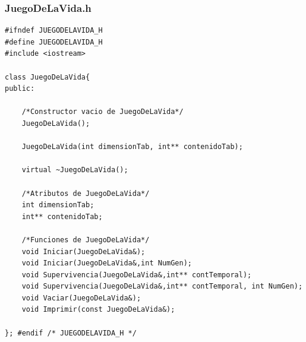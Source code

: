 \documentclass[12pt,letterpaper]{article}
\begin{document}
\subsubsection{JuegoDeLaVida.h}
\lstset {language=C}
\begin{lstlisting}
#ifndef JUEGODELAVIDA_H
#define JUEGODELAVIDA_H
#include <iostream>

class JuegoDeLaVida{
public:
	
    /*Constructor vacio de JuegoDeLaVida*/
    JuegoDeLaVida();
    
    JuegoDeLaVida(int dimensionTab, int** contenidoTab);
    
    virtual ~JuegoDeLaVida();
    
    /*Atributos de JuegoDeLaVida*/
    int dimensionTab;
    int** contenidoTab;
    
    /*Funciones de JuegoDeLaVida*/
    void Iniciar(JuegoDeLaVida&);
    void Iniciar(JuegoDeLaVida&,int NumGen);
    void Supervivencia(JuegoDeLaVida&,int** contTemporal);
    void Supervivencia(JuegoDeLaVida&,int** contTemporal, int NumGen);
    void Vaciar(JuegoDeLaVida&);
    void Imprimir(const JuegoDeLaVida&);

}; #endif /* JUEGODELAVIDA_H */

\end{lstlisting}
\end{document}
